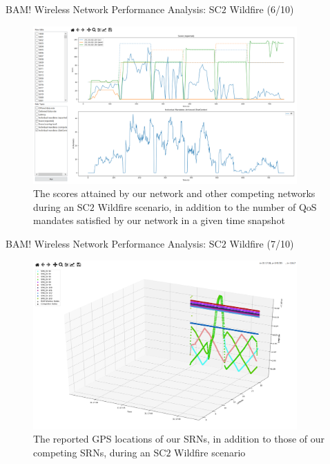 \documentclass{beamer}
\begin{document}
\begin{frame}{BAM! Wireless Network Performance Analysis: SC$2$ Wildfire (6/10)}
\begin{figure}
    \centering
    \includegraphics[width = 0.90\textwidth]{Wildfire_Scoring.PNG}
    \caption{The scores attained by our network and other competing networks during an SC$2$ Wildfire scenario, in addition to the number of QoS mandates satisfied by our network in a given time snapshot}
    \label{fig:24}
\end{figure}
\end{frame}
\begin{frame}{BAM! Wireless Network Performance Analysis: SC$2$ Wildfire (7/10)}
\begin{figure}
    \centering
    \includegraphics[width = 0.90\textwidth]{Wildfire_GPS.PNG}
    \caption{The reported GPS locations of our SRNs, in addition to those of our competing SRNs, during an SC$2$ Wildfire scenario}
    \label{fig:25}
\end{figure}
\end{frame}
\end{document}
